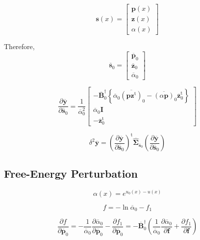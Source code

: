 \documentclass[aip,jcp,reprint,amsmath,amssymb]{revtex4-1}
\newcommand{\mt}[1]{\boldsymbol{\mathbf{#1}}}           %
\newcommand{\vt}[1]{\boldsymbol{\mathbf{#1}}}           %
\newcommand{\tr}[1]{#1^\text{t}}                        %
\begin{document}
\begin{equation*}
\vt s(x) = \left[\begin{array}{c} \vt p(x) \\ \vt z(x) \\ \alpha(x) \end{array}\right]
\end{equation*}

Therefore,
\begin{equation*}
\overline{\vt s}_0 = \left[\begin{array}{c} \overline{\vt p}_0 \\ \overline{\vt z}_0 \\ \overline{\alpha}_0 \end{array}\right]
\end{equation*}

\begin{equation*}
\frac{\partial \overline{\vt y}}{\partial \overline{\vt s}_0} =
\frac{1}{\overline{\alpha}_0^2}
\left[\begin{array}{c}
-\overline{\mt B}_0^\dag \left\{\overline{\alpha}_0 \overline{(\vt p\tr{\vt z})}_0 - \overline{(\alpha \vt p)}_0 \tr{\overline{\vt z}}_0 \right\} \\
\overline{\alpha}_0 {\mt I} \\
-\tr{\overline{\vt z}}_0
\end{array}\right]
\end{equation*}

\begin{equation*}
\delta^2 \overline{\vt y} = \tr{\left(\frac{\partial \overline{\vt y}}{\partial \overline{\vt s}_0}\right)} \hat{\mt \Sigma}_{\overline{\vt s}_0} \left(\frac{\partial \overline{\vt y}}{\partial \overline{\vt s}_0}\right)
\end{equation*}



\subsection{Free-Energy Perturbation}

\begin{equation*}
\alpha(x) = e^{u_0(x) - u(x)}
\end{equation*}

\begin{equation*}
f = -\ln \overline{\alpha}_0 - f_1
\end{equation*}

\begin{equation*}
\frac{\partial f}{\partial \overline{\vt p}_0} = -\frac{1}{\overline{\alpha}_0} \frac{\partial \overline{\alpha}_0}{\partial \overline{\vt p}_0}  - \frac{\partial f_1}{\partial \overline{\vt p}_0} = -\overline{\mt B}_0^\dag \left( \frac{1}{\overline{\alpha}_0} \frac{\partial \overline{\alpha}_0}{\partial \vt f} + \frac{\partial f_1}{\partial \vt f} \right)
\end{equation*}
\end{document}
